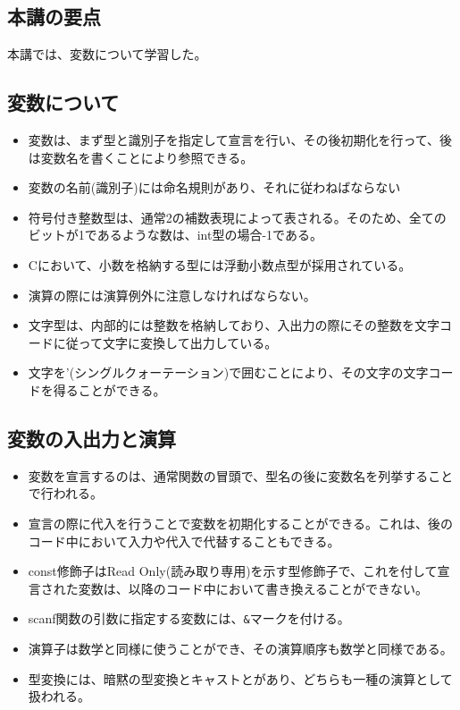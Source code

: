 \newpage

\begin{shadebox}
\section*{本講の要点}
本講では、変数について学習した。
\subsection*{変数について}
\begin{itemize}
\item 変数は、まず型と識別子を指定して宣言を行い、その後初期化を行って、後は変数名を書くことにより参照できる。
\item 変数の名前(識別子)には命名規則があり、それに従わねばならない
\item 符号付き整数型は、通常2の補数表現によって表される。そのため、全てのビットが1であるような数は、int型の場合-1である。
\item Cにおいて、小数を格納する型には浮動小数点型が採用されている。
\item 演算の際には演算例外に注意しなければならない。
\item 文字型は、内部的には整数を格納しており、入出力の際にその整数を文字コードに従って文字に変換して出力している。
\item 文字を'(シングルクォーテーション)で囲むことにより、その文字の文字コードを得ることができる。
\end{itemize}

\subsection*{変数の入出力と演算}
\begin{itemize}
\item 変数を宣言するのは、通常関数の冒頭で、型名の後に変数名を列挙することで行われる。
\item 宣言の際に代入を行うことで変数を初期化することができる。これは、後のコード中において入力や代入で代替することもできる。
\item const修飾子はRead Only(読み取り専用)を示す型修飾子で、これを付して宣言された変数は、以降のコード中において書き換えることができない。
\item scanf関数の引数に指定する変数には、\verb|&|マークを付ける。
\item 演算子は数学と同様に使うことができ、その演算順序も数学と同様である。
\item 型変換には、暗黙の型変換とキャストとがあり、どちらも一種の演算として扱われる。
\end{itemize}
\end{shadebox}
